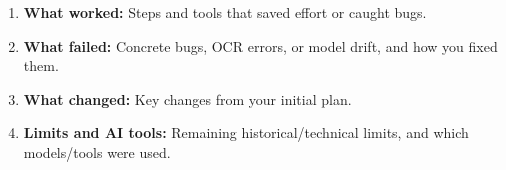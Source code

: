 \documentclass[12pt,a4paper]{article}
\begin{document}
\begin{enumerate}
  \item \textbf{What worked:} Steps and tools that saved effort or caught bugs.
  \item \textbf{What failed:} Concrete bugs, OCR errors, or model drift, and how you fixed them.
  \item \textbf{What changed:} Key changes from your initial plan.
  \item \textbf{Limits and AI tools:} Remaining historical/technical limits, and which models/tools were used.
\end{enumerate}

\singlespacing
\printbibliography[title={Bibliography}]
\end{document}
